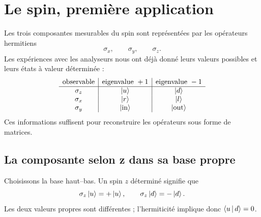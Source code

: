 \begin{classroomqa}\end{classroomqa}

\section{Le spin, première application}

Les trois composantes mesurables du spin sont représentées par les opérateurs hermitiens
\[
\sigma_x,\qquad \sigma_y,\qquad \sigma_z.
\]
Les expériences avec les analyseurs nous ont déjà donné leurs valeurs possibles et leurs états à valeur déterminée :
\[
\begin{array}{c|c|c}
\text{observable}&\text{eigenvalue }+1&\text{eigenvalue }-1\\ \hline
\sigma_z&\left\lvert u\right\rangle&\left\lvert d\right\rangle\\
\sigma_x&\left\lvert r\right\rangle&\left\lvert l\right\rangle\\
\sigma_y&\left\lvert\mathrm{in}\right\rangle&\left\lvert\mathrm{out}\right\rangle
\end{array}
\]
Ces informations suffisent pour reconstruire les opérateurs sous forme de matrices.

\subsection{La composante selon z dans sa base propre}

Choisissons la base haut--bas. Un spin \(z\) déterminé signifie que
\begin{equation}
\sigma_z\left\lvert u\right\rangle=+\left\lvert u\right\rangle,
\qquad
\sigma_z\left\lvert d\right\rangle=-\left\lvert d\right\rangle.
\label{eq:sigma-z-eigenvectors}
\end{equation}
Les deux valeurs propres sont différentes ; l’hermiticité implique donc \(\left\langle u\,\middle|\,d\right\rangle=0\).

